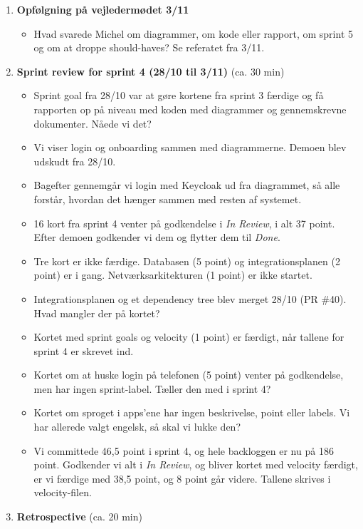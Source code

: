 \documentclass[a4paper,11pt]{article}
\begin{document}
\begin{enumerate}
    \item \textbf{Opfølgning på vejledermødet 3/11}
    \begin{itemize}
        \item Hvad svarede Michel om diagrammer, om kode eller rapport, om sprint 5 og om at droppe should-haves? Se referatet fra 3/11.
    \end{itemize}
    \item \textbf{Sprint review for sprint 4 (28/10 til 3/11)} (ca. 30 min)
    \begin{itemize}
        \item Sprint goal fra 28/10 var at gøre kortene fra sprint 3 færdige og få rapporten op på niveau med koden med diagrammer og gennemskrevne dokumenter. Nåede vi det?
        \item Vi viser login og onboarding sammen med diagrammerne. Demoen blev udskudt fra 28/10.
        \item Bagefter gennemgår vi login med Keycloak ud fra diagrammet, så alle forstår, hvordan det hænger sammen med resten af systemet.
        \item 16 kort fra sprint 4 venter på godkendelse i \emph{In Review}, i alt 37 point. Efter demoen godkender vi dem og flytter dem til \emph{Done}.
        \item Tre kort er ikke færdige. Databasen (5 point) og integrationsplanen (2 point) er i gang. Netværksarkitekturen (1 point) er ikke startet.
        \item Integrationsplanen og et dependency tree blev merget 28/10 (PR \#40). Hvad mangler der på kortet?
        \item Kortet med sprint goals og velocity (1 point) er færdigt, når tallene for sprint 4 er skrevet ind.
        \item Kortet om at huske login på telefonen (5 point) venter på godkendelse, men har ingen sprint-label. Tæller den med i sprint 4?
        \item Kortet om sproget i apps'ene har ingen beskrivelse, point eller labels. Vi har allerede valgt engelsk, så skal vi lukke den?
        \item Vi committede 46,5 point i sprint 4, og hele backloggen er nu på 186 point. Godkender vi alt i \emph{In Review}, og bliver kortet med velocity færdigt, er vi færdige med 38,5 point, og 8 point går videre. Tallene skrives i velocity-filen.
    \end{itemize}
    \item \textbf{Retrospective} (ca. 20 min)

\end{enumerate}
\end{document}

